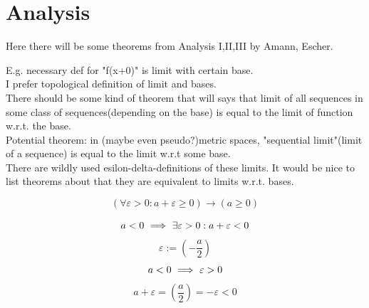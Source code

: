 \def\topic{Analysis}

\section{Analysis}
Here there will be some theorems from Analysis I,II,III by Amann, Escher.

E.g. necessary def for "f(x+0)" is limit with certain base.\\
I prefer topological definition of limit and bases.\\
There should be some kind of theorem that will says that limit of all sequences in some class of sequences(depending on the base) is equal to the limit of function w.r.t. the base.\\
Potential theorem: in (maybe even pseudo?)metric spaces, "sequential limit"(limit of a sequence) is equal to the limit w.r.t some base.\\
There are wildly used esilon-delta-definitions of these limits. It would be nice to list theorems about that they are equivalent to limits w.r.t. bases.\\


\begin{theorem}
\[
(\forall \varepsilon >0: a+\varepsilon \geqslant 0) \to (a \geqslant 0)
\]
\end{theorem}
\Proof
\[
a<0
\ \Longrightarrow\ 
\exists \varepsilon > 0 : a+\varepsilon < 0
\]
\[
\varepsilon := \left(-\frac{a}{2}\right)
\]
\[
a<0
\ \Longrightarrow\ 
\varepsilon > 0
\]
\[
a+\varepsilon = \left(\frac{a}{2}\right) = -\varepsilon < 0
\]

\Done

